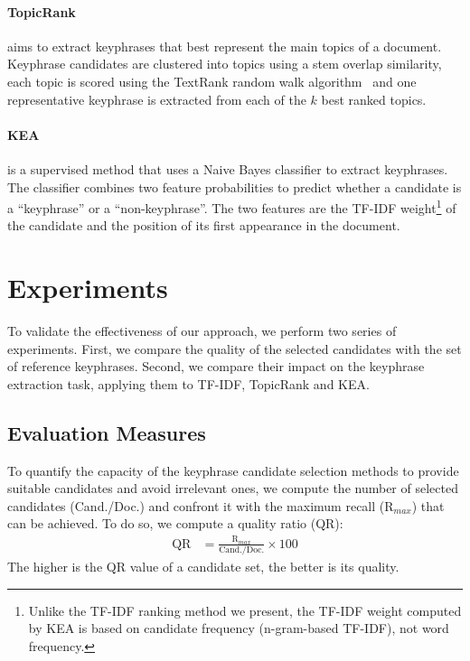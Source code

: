   \paragraph{TopicRank~\textnormal{\cite{bougouin2013topicrank}}} aims to
  extract keyphrases that best represent the main topics of a document.
  Keyphrase candidates are clustered into topics using a stem overlap
  similarity, each topic is scored using the TextRank random walk
  algorithm~\cite{mihalcea2004textrank} and one representative keyphrase is
  extracted from each of the $k$ best ranked topics.

  \paragraph{KEA~\textnormal{\cite{witten1999kea}}} is a supervised method that
  uses a Naive Bayes classifier to extract keyphrases. The classifier combines
  two feature probabilities to predict whether a candidate is a ``keyphrase'' or
  a ``non-keyphrase''. The two features are the TF-IDF weight\footnote{Unlike
  the TF-IDF ranking method we present, the TF-IDF weight computed by KEA is
  based on candidate frequency (n-gram-based TF-IDF), not word frequency.} of
  the candidate and the position of its first appearance in the document.

\section{Experiments}
\label{sec:evaluation}
  To validate the effectiveness of our approach, we perform two series of
  experiments. First, we compare the quality of the selected candidates with the
  set of reference keyphrases. Second, we compare their impact on the keyphrase
  extraction task, applying them to TF-IDF, TopicRank and KEA.

  \subsection{Evaluation Measures}
  \label{subsec:keyphrase_extraction_evaluation_measures}
    To quantify the capacity of the keyphrase candidate selection methods to
    provide suitable candidates and avoid irrelevant ones, we compute the
    number of selected candidates (Cand./Doc.) and confront it with the
    maximum recall (R$_{max}$) that can be achieved. To do so, we compute a
    quality ratio (QR):
    \begin{align}
      \text{QR} &= \frac{\text{R$_{max}$}}{\text{Cand./Doc.}} \times 100
    \end{align}
    The higher is the QR value of a candidate set, the better is its quality.


